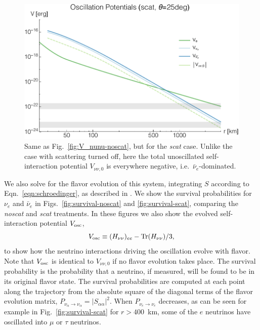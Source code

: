 \documentclass[aps,floatfix,prd,superscriptaddress,twocolumn]{revtex4-1}
\begin{document}
\begin{figure}
  \includegraphics[width=\columnwidth]{20180615-potentials-Ve_Vnue_Vnua_Vnu-000Mo-025deg-scat}
  \caption{Same as Fig.~\ref{fig:V_nunu-noscat},
    but for the \emph{scat} case.
    Unlike the case with scattering turned off,
    here the total unoscillated self-interaction potential $V_{\nu\nu,0}$
    is everywhere negative, i.e.\ $\bar{\nu}_e$-dominated.
    }
  \label{fig:V_nunu-scat}
\end{figure}

We also solve for the flavor evolution of this system,
integrating $S$ according to Eqn.~\ref{eqn:schroedinger},
as described in \cite{zhu2016-mnr_nsns_remnant}.
We show the survival probabilities for $\nu_e$ and $\bar{\nu}_e$
in Figs.~\ref{fig:survival-noscat} and \ref{fig:survival-scat},
comparing the \emph{noscat} and \emph{scat} treatments.
In these figures we also show the evolved self-interaction potential
$V_{\rm osc}$,
\begin{equation}
  \label{eqn:V_osc}
  V_{\rm osc} \equiv (H_{\nu\nu})_{ee}-{\rm Tr}(H_{\nu\nu})/3,
\end{equation}
to show how the neutrino interactions driving the oscillation evolve with flavor.
Note that $V_{\rm osc}$ is identical to $V_{\nu\nu,0}$ if no flavor
evolution takes place.
The survival probability is the probability that a neutrino, if measured,
will be found to be in its original flavor state.
The survival probabilities are computed at each point along the trajectory
from the absolute square of the diagonal terms of the flavor evolution matrix,
$P_{\nu_\alpha \to \nu_\alpha} = |S_{\alpha \alpha}|^2$.
When $P_{\nu_e \to \nu_e}$ decreases,
as can be seen for example in Fig.~\ref{fig:survival-scat} for $r>400$~km,
some of the $e$ neutrinos have oscillated into $\mu$ or $\tau$ neutrinos.
\end{document}
